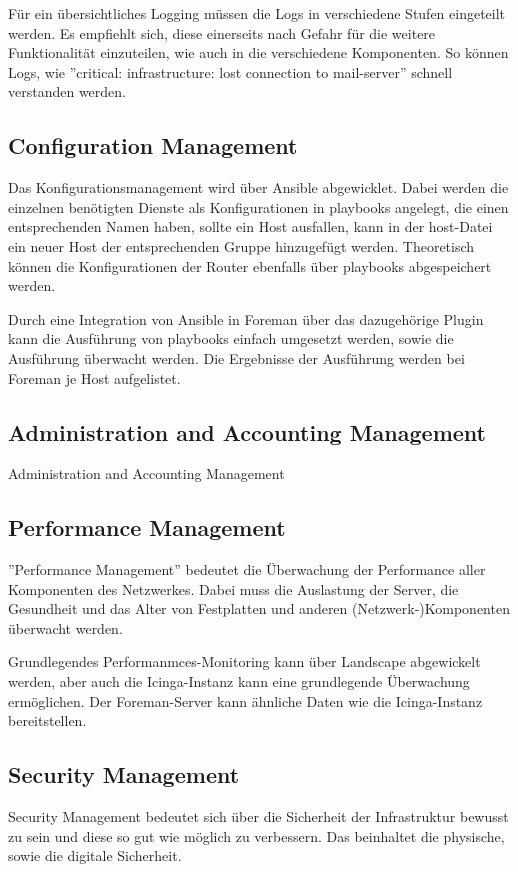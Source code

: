 Für ein übersichtliches Logging müssen die Logs in verschiedene Stufen eingeteilt werden. Es empfiehlt sich, diese einerseits nach Gefahr für die weitere Funktionalität einzuteilen, wie auch in die verschiedene Komponenten. So können Logs, wie ''critical: infrastructure: lost connection to mail-server'' schnell verstanden werden.

\subsection{Configuration Management}
Das Konfigurationsmanagement wird über Ansible abgewicklet. Dabei werden die einzelnen benötigten Dienste als Konfigurationen in playbooks angelegt, die einen entsprechenden Namen haben, sollte ein Host ausfallen, kann in der host-Datei ein neuer Host der entsprechenden Gruppe hinzugefügt werden. Theoretisch können die Konfigurationen der Router ebenfalls über playbooks abgespeichert werden. 

Durch eine Integration von Ansible in Foreman über das dazugehörige Plugin kann die Ausführung von playbooks einfach umgesetzt werden, sowie die Ausführung überwacht werden. Die Ergebnisse der Ausführung werden bei Foreman je Host aufgelistet.

\subsection{Administration and Accounting Management}
Administration and Accounting Management


\subsection{Performance Management}
''Performance Management'' bedeutet die Überwachung der Performance aller Komponenten des Netzwerkes. Dabei muss die Auslastung der Server, die Gesundheit und das Alter von Festplatten und anderen (Netzwerk-)Komponenten überwacht werden.

Grundlegendes Performanmces-Monitoring kann über Landscape abgewickelt werden, aber auch die Icinga-Instanz kann eine grundlegende Überwachung ermöglichen. Der Foreman-Server kann ähnliche Daten wie die Icinga-Instanz bereitstellen.

\subsection{Security Management}
Security Management bedeutet sich über die Sicherheit der Infrastruktur bewusst zu sein und diese so gut wie möglich zu verbessern. Das beinhaltet die physische, sowie die digitale Sicherheit.


